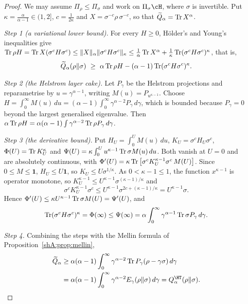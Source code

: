 \begin{proof}
We may assume $\Pi_\rho\le\Pi_\sigma$ and work on $\Pi_\sigma\cH$, where $\sigma$ is invertible. Put $\kappa=\frac{\alpha}{\alpha-1}\in(1,2]$, $c=\frac1{2\kappa}$ and $X=\sigma^{-c}\rho\,\sigma^{-c}$, so that $\widetilde Q_\alpha=\operatorname{Tr} X^\alpha$.

\emph{Step 1 (a variational lower bound).} For every $H\ge0$, H\"older's and Young's inequalities give $\operatorname{Tr}\rho H=\operatorname{Tr} X(\sigma^cH\sigma^c)\le\|X\|_\alpha\|\sigma^cH\sigma^c\|_\kappa\le\frac1\alpha\operatorname{Tr} X^\alpha+\frac1\kappa\operatorname{Tr}(\sigma^cH\sigma^c)^\kappa$, that is,
\[
\widetilde Q_\alpha(\rho\|\sigma)\ \ge\ \alpha\Tr\rho H-(\alpha-1)\Tr(\sigma^cH\sigma^c)^\kappa .
\]

\emph{Step 2 (the Helstrom layer cake).} Let $P_\gamma$ be the Helstrom projections and reparametrise by $u=\gamma^{\alpha-1}$, writing $M(u)=P_{u^{\kappa-1}}$. Choose $H=\int_0^\infty M(u)\,du=(\alpha-1)\int_0^\infty\gamma^{\alpha-2}P_\gamma\,d\gamma$, which is bounded because $P_\gamma=0$ beyond the largest generalised eigenvalue. Then $\alpha\operatorname{Tr}\rho H=\alpha(\alpha-1)\int\gamma^{\alpha-2}\operatorname{Tr}\rho P_\gamma\,d\gamma$.

\emph{Step 3 (the derivative bound).} Put $H_U=\int_0^UM(u)\,du$, $K_U=\sigma^cH_U\sigma^c$, $\Phi(U)=\operatorname{Tr} K_U^\kappa$ and $\Psi(U)=\kappa\int_0^Uu^{\kappa-1}\operatorname{Tr}\sigma M(u)\,du$. Both vanish at $U=0$ and are absolutely continuous, with $\Phi'(U)=\kappa\operatorname{Tr}\big[\sigma^cK_U^{\kappa-1}\sigma^c\,M(U)\big]$. Since $0\le M\le\mathbf 1$, $H_U\le U\mathbf 1$, so $K_U\le U\sigma^{1/\kappa}$. As $0<\kappa-1\le1$, the function $x^{\kappa-1}$ is operator monotone, so $K_U^{\kappa-1}\le U^{\kappa-1}\sigma^{(\kappa-1)/\kappa}$ and
\[
\sigma^cK_U^{\kappa-1}\sigma^c\le U^{\kappa-1}\sigma^{2c+(\kappa-1)/\kappa}=U^{\kappa-1}\sigma .
\]
Hence $\Phi'(U)\le\kappa U^{\kappa-1}\operatorname{Tr}\sigma M(U)=\Psi'(U)$, and
\[
\operatorname{Tr}(\sigma^cH\sigma^c)^\kappa=\Phi(\infty)\le\Psi(\infty)=\alpha\int_0^\infty\gamma^{\alpha-1}\operatorname{Tr}\sigma P_\gamma\,d\gamma .
\]

\emph{Step 4.} Combining the steps with the Mellin formula of Proposition~\ref{shA:prop:mellin},
\[
\begin{aligned}\widetilde Q_\alpha&\ge\alpha(\alpha-1)\int_0^\infty\gamma^{\alpha-2}\Tr P_\gamma(\rho-\gamma\sigma)\,d\gamma\\&=\alpha(\alpha-1)\int_0^\infty\gamma^{\alpha-2}E_\gamma(\rho\|\sigma)\,d\gamma=Q^\HT_\alpha(\rho\|\sigma).\end{aligned}\qedhere
\]
\end{proof}

